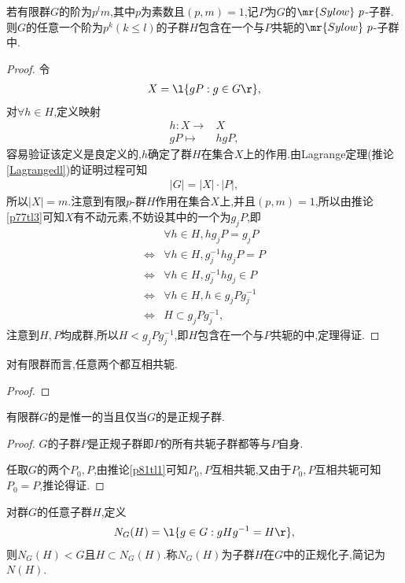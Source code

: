 \begin{theorem}[Sylow第二定理]\label{xldedl}
    若有限群$G$的阶为$p^lm$,其中$p$为素数且$(p,m)=1$,记$P$为$G$的$\mr{Sylow}\ p$-子群.则$G$的任意一个阶为$p^k(k\leq l)$的子群$H$包含在一个与$P$共轭的$\mr{Sylow}\ p$-子群中.
\end{theorem}
\begin{proof}
    令\begin{align*}
        X=\l\{gP:g\in G\r\},
    \end{align*}对$\forall h\in H$,定义映射\begin{align*}
        h:X\to&X\\
        gP\mapsto&hgP,
    \end{align*}容易验证该定义是良定义的,$h$确定了群$H$在集合$X$上的作用.由Lagrange定理(推论\ref{Lagrangedl})的证明过程可知\begin{align*}
        |G|=|X|\cdot|P|,
    \end{align*}所以$|X|=m$.注意到有限$p$-群$H$作用在集合$X$上,并且$(p,m)=1$,所以由推论\ref{p77tl3}可知$X$有不动元素,不妨设其中的一个为$g_jP$,即\begin{align*}
        &\forall h\in H,hg_jP=g_jP\\
        \iff&\forall h\in H,g_j^{-1}hg_jP=P\\
        \iff&\forall h\in H,g_j^{-1}hg_j\in P\\
        \iff&\forall h\in H,h\in g_jPg_j^{-1}\\
        \iff&H\subset g_jPg_j^{-1},
    \end{align*}注意到$H,P$均成群,所以$H<g_jPg_j^{-1}$,即$H$包含在一个与$P$共轭的中,定理得证.
\end{proof}
\begin{corollary}\label{p81tl1}
    对有限群而言,任意两个都互相共轭.
\end{corollary}
\begin{proof}
    \stars
\end{proof}
\begin{corollary}\label{asdinfjkasdfmk}
    有限群$G$的是惟一的当且仅当$G$的是正规子群.
\end{corollary}
\begin{proof}
    $G$的子群$P$是正规子群即$P$的所有共轭子群都等与$P$自身.

    任取$G$的两个$P_0,P$,由推论\ref{p81tl1}可知$P_0,P$互相共轭,又由于$P_0,P$互相共轭可知$P_0=P$,推论得证.
\end{proof}
\begin{definition}[正规化子]\label{vghz}
    对群$G$的任意子群$H$,定义\begin{align*}
        N_G(H)=\l\{g\in G:gHg^{-1}=H\r\},
    \end{align*}则$N_G(H)<G$且$H\subset N_G(H)$.称$N_G(H)$为子群$H$在$G$中的正规化子,简记为$N(H)$.
\end{definition}
